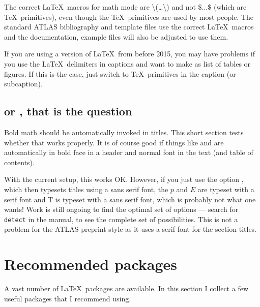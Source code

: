 The correct \LaTeX\ macros for math mode are \textbackslash(\ldots\textbackslash)
and not \(\$\ldots\$\) (which are \TeX\ primitives),
even though the \TeX\ primitives are used by most people.
 The standard ATLAS bibliography and template files use the correct \LaTeX\ macros and
the documentation, example files will also be adjusted to use them.

If you are using a version of \LaTeX\ from before 2015, you may have problems
if you use the \LaTeX\ delimiters in captions and want to make as list of tables or figures.
If this is the case, just switch to \TeX\ primitives in the caption (or subcaption).


\subsection{\pT or \ET, that is the question}

Bold math should be automatically invoked in titles.
This short section tests whether that works properly.
It is of course good if things like \pT and \ET are automatically in bold face in
a header and normal font in the text (and table of contents).

With the current setup, this works OK. 
However, if you just use the option , which then typesets titles using a sans serif font,
the $p$ and $E$ are typeset with a serif font and \textsf{T} is typeset with a sans serif font,
which is probably not what one wants!
Work is still ongoing to find the optimal set of options
--- search for \texttt{detect} in the  manual, to see the complete set of possibilities.
This is not a problem for the ATLAS preprint style as it uses a serif font for the section titles.


\section{Recommended packages}

A vast number of \LaTeX\ packages are available.
In this section I collect a few useful packages that I recommend using.

